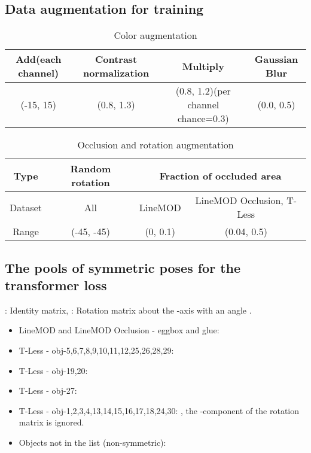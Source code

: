 \documentclass[10pt,twocolumn,letterpaper]{article}
\begin{document}
\subsection{Data augmentation for training}

\begin{table}[hbt]
\begin{center}
\begin{tabular}{ c| c| c| c}
  \hline
  Add(each channel) & Contrast normalization &Multiply  & Gaussian Blur\\
 
 \hline
 (-15, 15) & (0.8, 1.3) & (0.8, 1.2)(per channel chance=0.3) & (0.0, 0.5) \\
  \hline
\end{tabular}
\end{center}
\caption{Color augmentation}
\end{table}

\begin{table}[hbt]
\begin{center}
\begin{tabular}{ c| c| c |c}
  \hline
  Type &Random rotation &  \multicolumn{2}{c}{Fraction of occluded area}\\
  \hline
  Dataset &All &  LineMOD &  LineMOD Occlusion, T-Less \\
 \hline
   Range &(-45, -45) & (0, 0.1)&(0.04, 0.5)\\
  \hline
\end{tabular}
\end{center}
\caption{Occlusion and rotation augmentation}
\end{table}

\subsection{The pools of symmetric poses for the transformer loss}
: Identity matrix, : Rotation matrix about the -axis with an angle . 
\begin{itemize}
    \setlength\itemsep{0.2em}
    \item{LineMOD and LineMOD Occlusion - eggbox and glue:   }
    \item{T-Less - obj-5,6,7,8,9,10,11,12,25,26,28,29:   }
    \item{T-Less - obj-19,20:  }
    \item{T-Less - obj-27:  }
    \item{T-Less - obj-1,2,3,4,13,14,15,16,17,18,24,30: , the -component of the rotation matrix is ignored.}
    \item{Objects not in the list (non-symmetric): }
\end{itemize}
\end{document}

